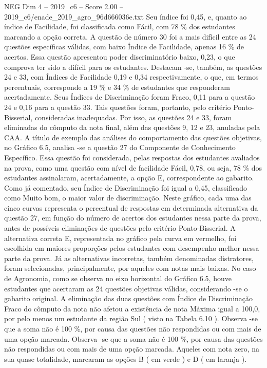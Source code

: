\begin{textsample}{NEG Dim 4 – 2019\_c6 – Score 2.00 – 2019\_c6/enade\_2019\_agro\_96d666036e.txt}
Seu índice foi 0,45, e, quanto ao índice de Facilidade, foi classificada como Fácil, com 78 \% dos estudantes marcando a opção correta.
A questão de número 30 foi a mais difícil entre as 24 questões específicas válidas, com baixo Índice de Facilidade, apenas 16 \% de acertos.
Essa questão apresentou poder discriminatório baixo, 0,23, o que comprova ter sido a difícil para os estudantes.
Destacam -se, também, as questões 24 e 33, com Índices de Facilidade 0,19 e 0,34 respectivamente, o que, em termos percentuais, corresponde a 19 \% e 34 \% de estudantes que responderam acertadamente.
Seus Índices de Discriminação foram Fraco, 0,11 para a questão 24 e 0,16 para a questão 33.
Tais questões foram, portanto, pelo critério Ponto-Bisserial, consideradas inadequadas.
Por isso, as questões 24 e 33, foram eliminadas do cômputo da nota final, além das questões 9, 12 e 23, anuladas pela CAA.
A título de exemplo das análises do comportamento das questões objetivas, no Gráfico 6.5, analisa -se a questão 27 do Componente de Conhecimento Específico.
Essa questão foi considerada, pelas respostas dos estudantes avaliados na prova, como uma questão com nível de facilidade Fácil, 0,78, ou seja, 78 \% dos estudantes assinalaram, acertadamente, a opção E, correspondente ao gabarito.
Como já comentado, seu Índice de Discriminação foi igual a 0,45, classificado como Muito bom, o maior valor de discriminação.
Neste gráfico, cada uma das cinco curvas representa o percentual de respostas em determinada alternativa da questão 27, em função do número de acertos dos estudantes nessa parte da prova, antes de possíveis eliminações de questões pelo critério Ponto-Bisserial.
A alternativa correta E, representada no gráfico pela curva em vermelho, foi escolhida em maiores proporções pelos estudantes com desempenho melhor nessa parte da prova.
Já as alternativas incorretas, também denominadas distratores, foram selecionadas, principalmente, por aqueles com notas mais baixas.
No caso de Agronomia, como se observa no eixo horizontal do Gráfico 6.5, houve estudantes que acertaram as 24 questões objetivas válidas, considerando -se o gabarito original.
A eliminação das duas questões com Índice de Discriminação Fraco do cômputo da nota não afetou a existência de nota Máxima igual a 100,0, por pelo menos um estudante da região Sul ( visto na Tabela 6.10 ).
Observa -se que a soma não é 100 \%, por causa das questões não respondidas ou com mais de uma opção marcada.
Observa -se que a soma não é 100 \%, por causa das questões não respondidas ou com mais de uma opção marcada.
Aqueles com nota zero, na sua quase totalidade, marcaram as opções B ( em verde ) e D ( em laranja ).

\end{textsample}
